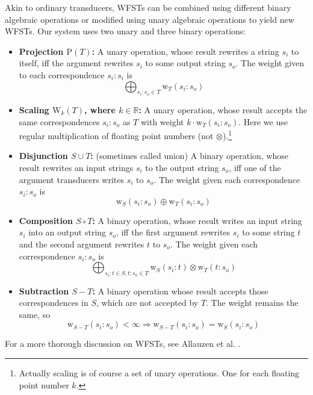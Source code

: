 \documentclass[a4paper,conference]{IEEEtran}
\begin{document}
Akin to ordinary transducers, WFSTs can be combined using
different binary algebraic operations or modified using unary
algebraic operations to yield new WFSTs. Our system uses two unary and three binary operations:
\begin{itemize}
\item {\bf Projection $\mathrm{P}(T)$:} A unary operation, whose result
  rewrites a string $s_i$ to itself, iff the argument rewrites $s_i$
  to some output string $s_o$. The weight given to each correspondence
  $s_i:s_i$ is
  \begin{equation}
    \bigoplus_{s_i\mathrm{:}s_o \in T} \mathrm{w}_T(s_i\mathrm{:}s_o)
  \end{equation}
\item {\bf Scaling $\mathrm{W}_k(T)$, where $k \in \mathbb{R}$:} A unary operation, whose result accepts the same correspondences $s_i\mathrm{:}s_o$ as $T$ with weight $k\cdot \mathrm{w}_T(s_i\mathrm{:}s_o)$. Here we use regular multiplication of floating point numbers (not $\otimes$).\footnote{Actually scaling is of course a set of unary operations. One for each floating point number $k$.}
\item {\bf Disjunction $S \cup T$:} (sometimes called union) A binary
  operation, whose result rewrites an input strings $s_i$ to the
  output string $s_o$, iff one of the argument transducers writes
  $s_i$ to $s_o$. The weight given each correspondence
  $s_i\mathrm{:}s_o$ is
  \begin{equation}
    \mathrm{w}_S(s_i\mathrm{:}s_o) \oplus \mathrm{w}_T(s_i\mathrm{:}s_o)
  \end{equation}
\item {\bf Composition $S \circ T$:} A binary operation, whose result
  writes an input string $s_i$ into an output string $s_o$, iff the
  first argument rewrites $s_i$ to some string $t$ and the second
  argument rewrites $t$ to $s_o$. The weight given each correspondence
  $s_i\mathrm{:}s_o$ is
  \begin{equation}
    \bigoplus_{s_i\mathrm{:}t \in S, t\mathrm{:}s_o \in T} \mathrm{w}_S(s_i\mathrm{:}t) \otimes \mathrm{w}_T(t\mathrm{:}s_o)
    \end{equation}
\item {\bf Subtraction $S - T$:} A binary operation whose result accepts those correspondences in $S$, which are not accepted by $T$. The weight remains the same, so
  \begin{equation}
    \mathrm{w}_{S-T}(s_i\mathrm{:}s_o) < \infty \Rightarrow \mathrm{w}_{S-T}(s_i\mathrm{:}s_o) = \mathrm{w}_{S}(s_i\mathrm{:}s_o)
  \end{equation}
\end{itemize}
For a more thorough discussion on WFSTs, see Allauzen et al. \cite{openfst/2007}.
\end{document}
